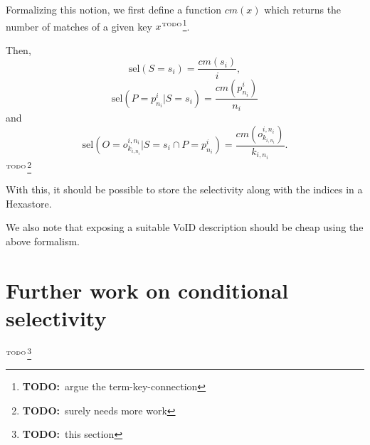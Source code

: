 \documentclass[12pt, draft]{article}
\newcommand{\todo}[1]{\ensuremath{^{\textrm{\tiny{TODO}\normalsize}}}\footnote{\textbf{TODO:}~#1}}
\newcommand{\sel}[1]{\ensuremath{\mathrm{sel}\left(#1\right)}}
\begin{document}
Formalizing this notion, we first define a function $cm(x)$ which
returns the number of matches of a given key $x$\todo{argue the
  term-key-connection}. 

Then, 
\begin{equation}
\sel{S = s_i} = \frac{cm(s_i)}{i} ,
\end{equation}
\begin{equation}
\sel{P = p_{n_i}^i|S = s_i} = \frac{cm(p_{n_i}^i)}{n_i}
\end{equation}
and
\begin{equation}
\sel{O = o_{k_{i,n_i}}^{i,n_i} |S = s_i \cap P = p_{n_i}^i} =
\frac{cm(o_{k_{i,n_i}}^{i,n_i})}{k_{i,n_i}} .
\end{equation}
\todo{surely needs more work}

With this, it should be possible to store the selectivity along with
the indices in a Hexastore.

We also note that exposing a suitable VoID description should be cheap
using the above formalism.

\section{Further work on conditional selectivity}

\todo{this section}



\end{document}
